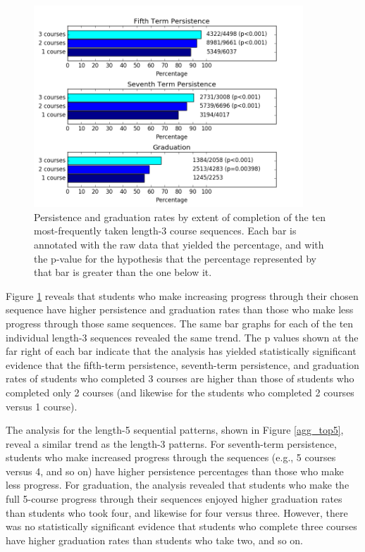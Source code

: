 \begin{figure}[htbp]
\centering
\includegraphics[width=0.9\textwidth]{figures/agg_top3_metrocomp.png}
\caption{Persistence and graduation rates by extent of completion of the ten most-frequently taken length-3 course sequences.  Each bar is annotated with the raw data that yielded the percentage, and with the p-value for the hypothesis that the percentage represented by that bar is greater than the one below it.}
\label{agg_top3}
\end{figure}

Figure \ref{agg_top3} reveals that students who make increasing progress through their chosen sequence have higher persistence and graduation rates than those who make less progress through those same sequences.  The same bar graphs for each of the ten individual length-3 sequences revealed the same trend.  The p values shown at the far right of each bar indicate that the analysis has yielded statistically significant evidence that the fifth-term persistence, seventh-term persistence, and graduation rates of students who completed 3 courses are higher than those of students who completed only 2 courses (and likewise for the students who completed 2 courses versus 1 course). 

The analysis for the length-5 sequential patterns, shown in Figure \ref{agg_top5}, reveal a similar trend as the length-3 patterns. For seventh-term persistence, students who make increased progress through the sequences (e.g., 5 courses versus 4, and so on) have higher persistence percentages than those who make less progress.  For graduation, the analysis revealed that students who make the full 5-course progress through their sequences enjoyed higher graduation rates than students who took four, and likewise for four versus three. However, there was no statistically significant evidence that students who complete three courses have higher graduation rates than students who take two, and so on.

